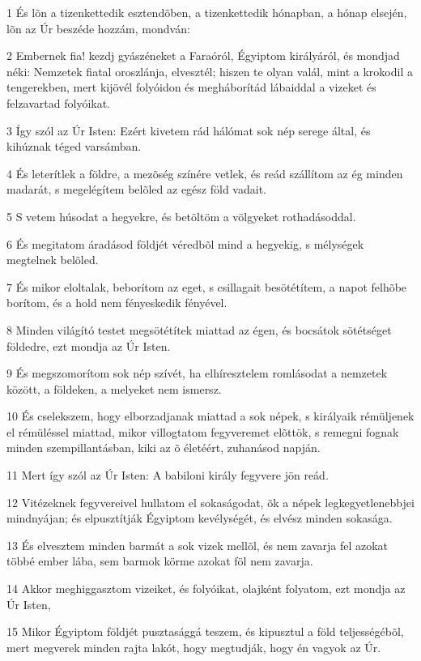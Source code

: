 \par 1 És lõn a tizenkettedik esztendõben, a tizenkettedik hónapban, a hónap elsején, lõn az Úr beszéde hozzám, mondván:
\par 2 Embernek fia! kezdj gyászéneket a Faraóról, Égyiptom királyáról, és mondjad néki: Nemzetek fiatal oroszlánja, elvesztél; hiszen te olyan valál, mint a krokodil a tengerekben, mert kijövél folyóidon és megháborítád lábaiddal a vizeket és felzavartad folyóikat.
\par 3 Így szól az Úr Isten: Ezért kivetem rád hálómat sok nép serege által, és kihúznak téged varsámban.
\par 4 És leterítlek a földre, a mezõség színére vetlek, és reád szállítom az ég minden madarát, s megelégítem belõled az egész föld vadait.
\par 5 S vetem húsodat a hegyekre, és betöltöm a völgyeket rothadásoddal.
\par 6 És megitatom áradásod földjét véredbõl mind a hegyekig, s mélységek megtelnek belõled.
\par 7 És mikor eloltalak, beborítom az eget, s csillagait besötétítem, a napot felhõbe borítom, és a hold nem fényeskedik fényével.
\par 8 Minden világító testet megsötétítek miattad az égen, és bocsátok sötétséget földedre, ezt mondja az Úr Isten.
\par 9 És megszomorítom sok nép szívét, ha elhíresztelem romlásodat a nemzetek között, a földeken, a melyeket nem ismersz.
\par 10 És cselekszem, hogy elborzadjanak miattad a sok népek, s királyaik rémüljenek el rémüléssel miattad, mikor villogtatom fegyveremet elõttök, s remegni fognak minden szempillantásban, kiki az õ életéért, zuhanásod napján.
\par 11 Mert így szól az Úr Isten: A babiloni király fegyvere jön reád.
\par 12 Vitézeknek fegyvereivel hullatom el sokaságodat, õk a népek legkegyetlenebbjei mindnyájan; és elpusztítják Égyiptom kevélységét, és elvész minden sokasága.
\par 13 És elvesztem minden barmát a sok vizek mellõl, és nem zavarja fel azokat többé ember lába, sem barmok körme azokat föl nem zavarja.
\par 14 Akkor meghiggasztom vizeiket, és folyóikat, olajként folyatom, ezt mondja az Úr Isten,
\par 15 Mikor Égyiptom földjét pusztasággá teszem, és kipusztul a föld teljességébõl, mert megverek minden rajta lakót, hogy megtudják, hogy én vagyok az Úr.
